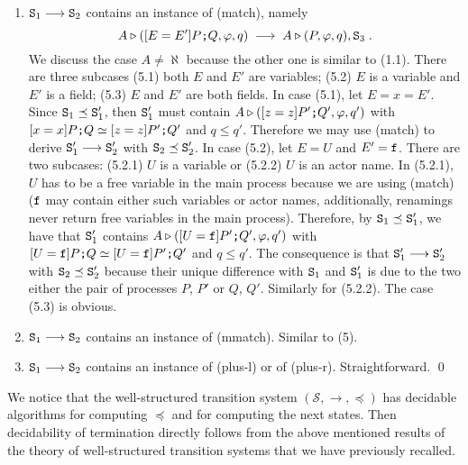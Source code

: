 \documentclass{LMCS}
\newcommand{\cal}{\mathcal}
\theoremstyle{plain}\newtheorem{proposition}[thm]{Proposition}
\theoremstyle{plain}\newtheorem{lemma}[thm]{Lemma}
\theoremstyle{plain}\newtheorem{theorem}[thm]{Theorem}
\theoremstyle{plain}\newtheorem{corollary}[thm]{Corollary}
\newif\ifcamera \camerafalse
\newcommand{\rulename}[1]{{\sc(#1)}}
\newcommand{\State}{{\tt S}}
\newcommand{\lred}[1]{\stackrel{#1}{\longrightarrow}}
\newcommand{\f}{{\tt f}}
\newcommand{\ite}{\mbox{{\tt ;}}}
\begin{document}
\begin{enumerate}
\item
$\State_1 \lred{} \State_2$ contains an instance of \rulename{match}, namely
\[A \triangleright ([E=E'] P \ite Q , \varphi, q) 
	\; \lred{} \; A \triangleright (P , \varphi, q), \State_3\;.\]
We discuss the case $A \neq \aleph$ because the other one is similar to (1.1).
There are three subcases (5.1) both $E$ and $E'$ are variables;
(5.2) $E$ is a variable and $E'$ is a field; (5.3) $E$ and $E'$ are
both fields. In case (5.1), let $E = x = E'$. Since $\State_1 
\preceq \State_1'$, then $\State_1'$ must contain $A \triangleright 
([z = z] P' \ite Q' , \varphi, q')$ with $[x=x] P \ite Q \simeq 
[z= z] P' \ite Q'$ and $q \leq q'$. Therefore we may use \rulename{match} to derive
$\State_1'  \lred{} \State_2'$ with $\State_2 \preceq \State_2'$.
In case (5.2), let $E = U$ and $E' = \f$.
There are two subcases: (5.2.1) $U$ is a variable or (5.2.2) $U$ is an actor name.
In (5.2.1), $U$ has to be a free variable in the main process because we are
using \rulename{match} ($\f$ may contain either such variables or actor names, additionally, renamings never return free variables in the main process). Therefore, by 
$\State_1 
\preceq \State_1'$, we have that $\State_1'$ contains $A \triangleright 
([U = \f] P' \ite Q' , \varphi, q')$ with $[U=\f] P \ite Q \simeq 
[U= \f] P' \ite Q'$ and $q \leq q'$. The consequence is that
$\State_1'  \lred{} \State_2'$ with $\State_2 \preceq \State_2'$ 
because their unique difference with $\State_1$ and $\State_1'$
is due to the two either the pair of processes $P$, $P'$
or $Q$, $Q'$.
Similarly for (5.2.2). 
The case (5.3) is obvious. 

\item
$\State_1 \lred{} \State_2$ contains an instance of \rulename{mmatch}. Similar to (5).

\item
$\State_1 \lred{} \State_2$ contains an instance of \rulename{plus-l} or of 
\rulename{plus-r}. Straightforward.
\qed
\end{enumerate}
\fi


We notice that the well-structured transition system $({\cal S}, \lred{}, \preceq)$ 
has decidable algorithms for computing $\preceq$ and for computing the next states. 
Then decidability of termination directly follows from the above mentioned
results of the theory of well-structured transition systems that we have
previously recalled.
\ifcamera
Then decidability of termination follows.
\else
\fi

\ifcamera
\else
\fi
\end{document}
